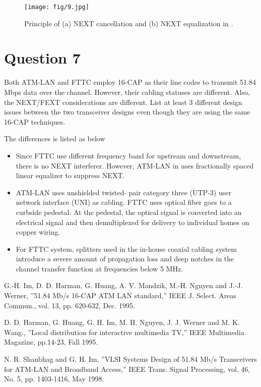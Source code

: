 \documentclass[journal]{IEEEtran}
\begin{document}
\begin{figure}[!tbp]
\center
\texttt{[image: fig/9.jpg]}
\caption{Principle of (a) NEXT cancellation and (b) NEXT equalization in \cite{REF1}.}
\label{fig11}
\end{figure}

\section{Question 7}
Both ATM-LAN \cite{REF3} and FTTC \cite{REF2} employ 16-CAP as their line codes to transmit 51.84 Mbps data over the channel.
However, their cabling statuses are different. 
Also, the NEXT/FEXT considerations are different. 
List at least 3 different design issues between the two transceiver designs even though they are using the same 16-CAP techniques. 

The differences is listed as below
\begin{itemize}
\item Since FTTC use different frequency band for upstream and downstream, there is no NEXT interferer.
However, ATM-LAN in \cite{REF3} uses fractionally
spaced linear equalizer to suppress NEXT.
\item ATM-LAN uses unshielded twisted-
pair category three (UTP-3) user network interface (UNI)
as cabling.
FTTC uses optical ﬁber goes to a curbside pedestal.
At the pedestal, the optical signal is converted into an electrical signal and then demultiplexed for delivery to individual homes on copper wiring.
\item For FTTC system, splitters used in the in-house coaxial cabling system introduce a severe amount of propagation loss and deep notches in the channel transfer function at frequencies below 5 MHz.
\end{itemize}

\begin{thebibliography}{99}
G.-H. Im,  D. D. Harman, G. Huang, A. V. Mandzik, 
M.-H. Nguyen and J.-J. Werner,
''51.84 Mb/s 16-CAP ATM LAN standard,''
{\rm IEEE J. Select. Areas Commun.}, 
vol. 13, pp. 620-632, Dec. 1995. 

D. D. Harman, G. Huang, G. H. Im, M. H. Nguyen, J. J. Werner and M. K. Wang.,
''Local distribution for interactive multimedia TV,''
{\rm IEEE Multimedia Magazine},
pp.14-23, Fall 1995. 

N. R. Shanbhag and G. H. Im, 
''VLSI Systems Design of 51.84 Mb/s Transceivers for ATM-LAN and Broadband Access,''
{\rm IEEE Trans. Signal Processing},
vol. 46, No. 5, pp. 1403-1416, May 1998. 

\end{thebibliography}
\end{document}
